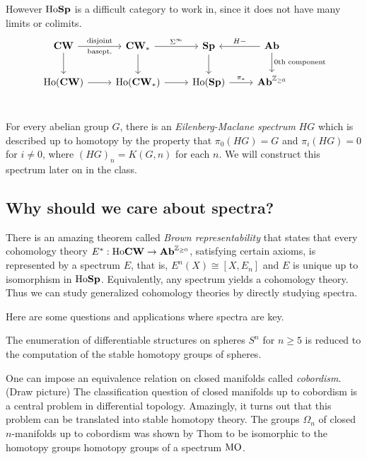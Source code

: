 \documentclass{article}[11pt]
\begin{document}
However $\text{Ho}\textbf{Sp}$ is a difficult category to work in, since it does not have many limits or colimits.
\[
	\begin{tikzcd}
	\CW\dar\rar["\text{disjoint}" above, "\text{basept.}" below] & \CW_\ast\dar \rar["\Sigma^\infty"] & \Sp\dar & \Ab\lar["H-"above]\dar["\text{0th component}"]\\
	\Ho(\CW)\rar & \Ho(\CW_\ast)\rar & \Ho(\Sp)\rar["\pi_\ast"] & \Ab^{\Z_{\geq 0}} \\
	\end{tikzcd}
\]


For every abelian group $G$, there is an \textit{Eilenberg-Maclane spectrum} $HG$ which is described up to homotopy by the property that $\pi_0(HG) = G$ and $\pi_i(HG) = 0$ for $i\neq 0$, where $(HG)_n = K(G,n)$ for each $n$. We will construct this spectrum later on in the class.

\subsection{Why should we care about spectra?}
There is an amazing theorem called \textit{Brown representability} that states that every cohomology theory $E^\ast : \text{Ho}\textbf{CW} \to \textbf{Ab}^{\mathbb{Z}_{\geq 0}}$, satisfying certain axioms, is represented by a spectrum $E$, that is, $E^n(X) \cong [X,E_n]$ and $E$ is unique up to isomorphism in $\text{Ho}\textbf{Sp}$. Equivalently, any spectrum yields a cohomology theory. Thus we can study generalized cohomology theories by directly studying spectra. 

Here are some questions and applications where spectra are key.

\begin{example} The enumeration of differentiable structures on spheres $S^n$ for $n\geq 5$ is reduced to the computation of the stable homotopy groups of spheres.
\end{example}
	
\begin{example} One can impose an equivalence relation on closed  manifolds called \emph{cobordism}. (Draw picture) The classification question of closed  manifolds up to cobordism is a central problem in differential topology. Amazingly, it turns out that this problem can be translated into stable homotopy theory. The groups $\Omega_n$ of closed  $n$-manifolds up to cobordism was shown by Thom to be isomorphic to the homotopy groups homotopy groups of a spectrum $\text{MO}$.
\end{example}
\end{document}
